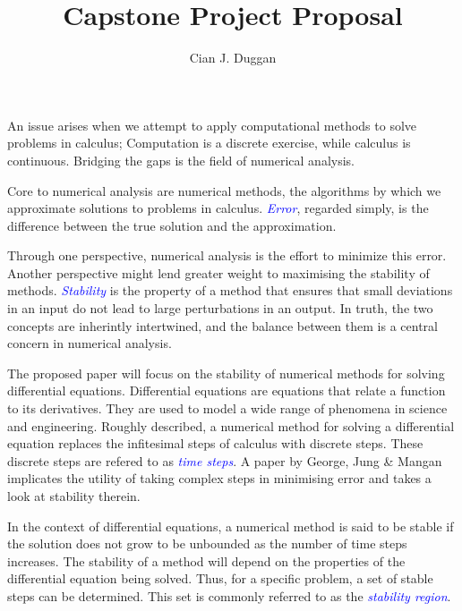 \documentclass[a4paper, fleqn]{article}
\newcommand{\term}[1]{\textcolor{blue}{\textit{#1}}} %
\begin{document}
\title{\bf Capstone Project Proposal}
\author{Cian J. Duggan}
\maketitle
\par An issue arises when we attempt to apply computational methods to solve problems in calculus;
Computation is a discrete exercise, while calculus is continuous.
Bridging the gaps is the field of numerical analysis.\\

\par Core to numerical analysis are numerical methods, the algorithms by which we approximate solutions to problems in calculus.
\term{Error}, regarded simply, is the difference between the true solution and the approximation.\\

\par Through one perspective, numerical analysis is the effort to minimize this error.
Another perspective might lend greater weight to maximising the stability of methods.
\term{Stability} is the property of a method that ensures that small deviations in an input do not lead to large perturbations in an output.
In truth, the two concepts are inherintly intertwined, and the balance between them is a central concern in numerical analysis.\\

\par The proposed paper will focus on the stability of numerical methods for solving differential equations.
Differential equations are equations that relate a function to its derivatives.
They are used to model a wide range of phenomena in science and engineering.
Roughly described, a numerical method for solving a differential equation replaces the infitesimal steps of calculus with discrete steps.
These discrete steps are refered to as \term{time steps}.
A paper by George, Jung \& Mangan~\cite{walking_into_the_complex_domain} implicates the utility of taking complex steps in minimising error and takes a look at stability therein.\\

\par In the context of differential equations, a numerical method is said to be stable if the solution does not grow to be unbounded as the number of time steps increases.
The stability of a method will depend on the properties of the differential equation being solved.
Thus, for a specific problem, a set of stable steps can be determined.
This set is commonly referred to as the \term{stability region}.\\
\end{document}
